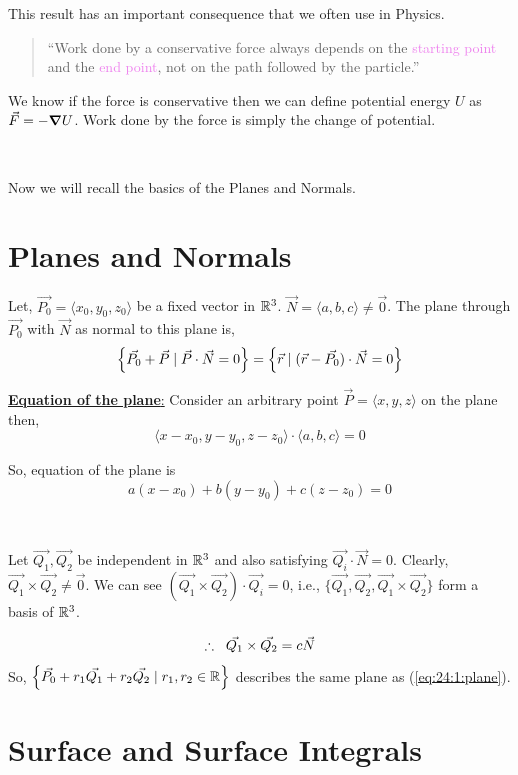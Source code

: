 \documentclass[../Analysis-3.tex]{subfiles}
\begin{document}
This result has an important consequence that we often use in Physics.

\begin{quotation}
  ``Work done by a conservative force always depends on the \textcolor{violet}{starting point} and the \textcolor{violet}{end point}, not on the path followed by the particle.''
\end{quotation}

We know if the force is conservative then we can define potential energy $U$ as $ \vec{F} = -\grad U$. Work done by the force is simply the change of potential.

\

Now we will recall the basics of the Planes and Normals.


\section{Planes and Normals}
Let, $\vec{P_0} = \langle x_0,y_0,z_0 \rangle$ be a fixed vector in $\mathbb{R}^3$. $\vec{N} = \langle a,b,c \rangle \neq \vec{0}$. The plane through $\vec{P_0}$ with $\vec{N}$ as normal to this plane is,
\[ \qty{\vec{P_0} + \vec{P} \mid \vec{P}\cdot \vec{N} = 0} = \qty{\vec{r} \mid (\vec{r}-\vec{P_0})\cdot \vec{N} = 0 } \]

\underline{\textbf{Equation of the plane}:} Consider an arbitrary point $\vec{P} = \langle x,y,z\rangle$ on the plane then, $$\langle x-x_0,y-y_0,z-z_0\rangle \cdot \langle a,b,c \rangle = 0$$

So, equation of the plane is
\begin{equation}
  a(x-x_0)+b(y-y_0) +c(z-z_0)= 0 \label{eq:24:1:plane}
\end{equation}

\

Let $\vec{Q_1},\vec{Q_2}$ be independent in $\mathbb{R}^3$ and also satisfying $\vec{Q_i} \cdot \vec{N} = 0$. Clearly, $\vec{Q_1}\times \vec{Q_2} \neq \vec{0}$. We can see $(\vec{Q_1}\times \vec{Q_2}) \cdot \vec{Q_i} = 0$, i.e., $\{\vec{Q_1},\vec{Q_2},\vec{Q_1}\times \vec{Q_2}\}$ form a basis of $\mathbb{R}^3$.

$$\therefore \hspace{0.2cm}\vec{Q_1}\times \vec{Q_2} = c \vec{N}$$
So, $\qty{\vec{P_0} + r_1 \vec{Q_1} + r_2 \vec{Q_2} \mid r_1,r_2 \in \mathbb{R}}$ describes the same plane as (\ref{eq:24:1:plane}).

\section{Surface and Surface Integrals}
\end{document}
